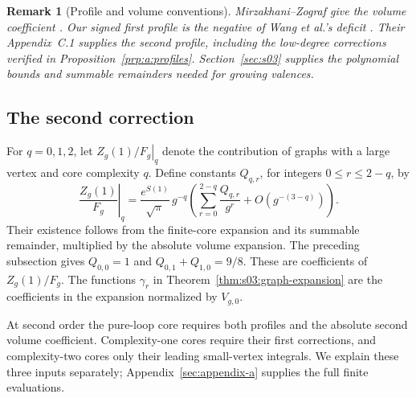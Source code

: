 \documentclass[a4paper,10pt]{article}
\numberwithin{equation}{section}
\theoremstyle{paperplain}
\theoremstyle{paperremark}
\newtheorem{rmk}{Remark}[section]
\theoremstyle{paperplain}
\begin{document}
\begin{rmk}[Profile and volume conventions]
Mirzakhani--Zograf give the volume coefficient
\cite[Theorem~1.2 and Remark~1.3]{MZ15}.
Our signed first profile is the negative of Wang et al.'s deficit
\cite[Lemma~7.2]{W26}. Their Appendix~C.1 supplies the second
profile, including the low-degree corrections verified in
Proposition~\ref{prp:a:profiles}.
Section~\ref{sec:s03} supplies the polynomial bounds and summable
remainders needed for growing valences.
\end{rmk}

\subsection{The second correction}
\label{subsec:s04:03}

For $q=0,1,2$, let $\left.Z_g(1)/F_g\right|_q$ denote the
contribution of graphs with a large vertex and core complexity $q$.
Define constants $Q_{q,r}$, for integers $0\leq r\leq2-q$, by
\begin{equation}\label{eq:s04:absolute-groups}
 \left.\frac{Z_g(1)}{F_g}\right|_q
 =\frac{e^{S(1)}}{\sqrt\pi}\,g^{-q}
       \left(\sum_{r=0}^{2-q}\frac{Q_{q,r}}{g^r}
                       +O(g^{-(3-q)})\right).
\end{equation}
Their existence follows from the finite-core expansion and its
summable remainder, multiplied by the absolute volume expansion.
The preceding subsection gives $Q_{0,0}=1$ and
$Q_{0,1}+Q_{1,0}=9/8$. These are coefficients of $Z_g(1)/F_g$.
The functions $\gamma_r$ in Theorem~\ref{thm:s03:graph-expansion}
are the coefficients in the expansion normalized by $V_{g,0}$.

At second order the pure-loop core requires both profiles and the
absolute second volume coefficient. Complexity-one cores require
their first corrections, and complexity-two cores only their leading
small-vertex integrals. We explain these three inputs separately;
Appendix~\ref{sec:appendix-a} supplies the full finite evaluations.
\end{document}
